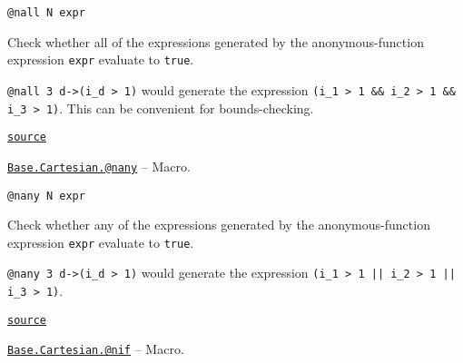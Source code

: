 \begin{adjustwidth}{2em}{0pt}


\begin{verbatim}
@nall N expr
\end{verbatim}

Check whether all of the expressions generated by the anonymous-function expression \texttt{expr} evaluate to \texttt{true}.

\texttt{@nall 3 d->(i\_d > 1)} would generate the expression \texttt{(i\_1 > 1 \&\& i\_2 > 1 \&\& i\_3 > 1)}. This can be convenient for bounds-checking.



\href{https://github.com/JuliaLang/julia/blob/44fa15b1502a45eac76c9017af94332d4557b251/base/cartesian.jl#L160-L168}{\texttt{source}}


\end{adjustwidth}
\hypertarget{11114957141394185901}{} 
\hyperlink{11114957141394185901}{\texttt{Base.Cartesian.@nany}}  -- {Macro.}

\begin{adjustwidth}{2em}{0pt}


\begin{verbatim}
@nany N expr
\end{verbatim}

Check whether any of the expressions generated by the anonymous-function expression \texttt{expr} evaluate to \texttt{true}.

\texttt{@nany 3 d->(i\_d > 1)} would generate the expression \texttt{(i\_1 > 1 || i\_2 > 1 || i\_3 > 1)}.



\href{https://github.com/JuliaLang/julia/blob/44fa15b1502a45eac76c9017af94332d4557b251/base/cartesian.jl#L177-L184}{\texttt{source}}


\end{adjustwidth}
\hypertarget{2428714678347040919}{} 
\hyperlink{2428714678347040919}{\texttt{Base.Cartesian.@nif}}  -- {Macro.}


